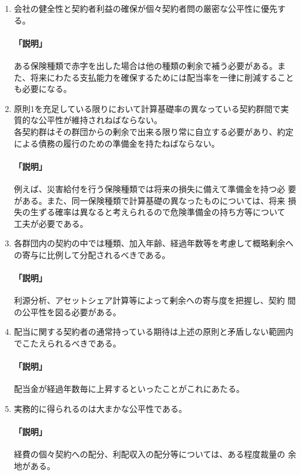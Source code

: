 \documentclass[report,gutter=10mm,fore-edge=10mm,uplatex,dvipdfmx]{jlreq}
\begin{document}
\begin{enumerate}[原則1.\ \ ]
 \item 
 会社の健全性と契約者利益の確保が個々契約者問の厳密な公平性に優先する。\\
 \paragraph{「説明」}
 ある保険種類で赤字を出した場合は他の種類の剰余で補う必要がある。ま
 た、将来にわたる支払能力を確保するためには配当率を一律に削減すること
 も必要になる。
 \item 
 原則1を充足している限りにおいて計算基礎率の異なっている契約群間で実
 質的な公平性が維持されねばならない。\\
 各契約群はその群団からの剰余で出来る限り常に自立する必要があり、約定
 による債務の履行のための準備金を持たねばならない。
 \paragraph{「説明」}
 例えば、災害給付を行う保険種類では将来の損失に備えて準備金を持つ必
 要がある。また、同一保険種類で計算基礎の異なったものについては、将来
 損失の生ずる確率は異なると考えられるので危険準備金の持ち方等について
 工夫が必要である。
 \item 
 各群団内の契約の中では種類、加入年齢、経過年数等を考慮して概略剰余へ
 の寄与に比例して分配されるべきである。\\
 \paragraph{「説明」}
 利源分析、アセットシェア計算等によって剰余への寄与度を把握し、契約
 間の公平性を図る必要がある。
 \item 
 配当に関する契約者の通常持っている期待は上述の原則と矛盾しない範囲内
 でこたえられるべきである。
 \paragraph{「説明」}
 配当金が経過年数毎に上昇するといったことがこれにあたる。
 \item 
 実務的に得られるのは大まかな公平性である。
 \paragraph{「説明」}
 経費の個々契約への配分、利配収入の配分等については、ある程度裁量の
 余地がある。
\end{enumerate}
\end{document}
